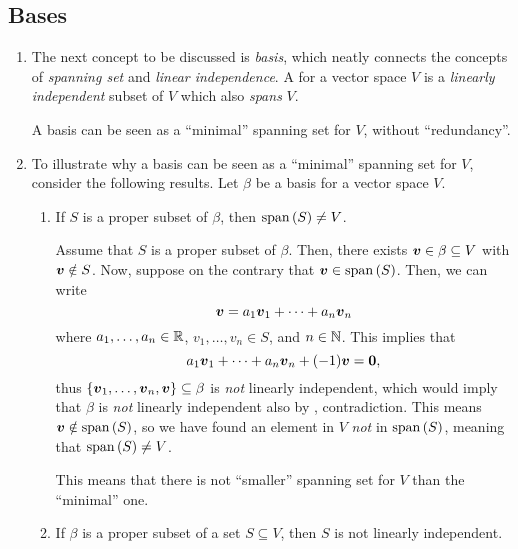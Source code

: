 \subsection{Bases}
\begin{enumerate}
\item The next concept to be discussed is \emph{basis}, which neatly connects
the concepts of \emph{spanning set} and \emph{linear independence}.  A
 for a vector space \(V\) is a \emph{linearly independent} subset
of \(V\) which also \emph{spans} \(V\).

\begin{intuition}
A basis can be seen as a ``minimal'' spanning set for \(V\), without
``redundancy''.
\end{intuition}

\item To illustrate why a basis can be seen as a ``minimal'' spanning set for
\(V\), consider the following results. Let \(\beta\) be a basis for a vector
space \(V\).
\begin{enumerate}
\item \label{it:span-set-not-smaller-than-basis} If \(S\) is a proper subset of \(\beta\), then \(\operatorname{span}\qty(S)\ne V\).

\begin{pf}
Assume that \(S\) is a proper subset of \(\beta\). Then, there exists
\(\vb*{v}\in\beta\subseteq V\) with \(\vb*{v}\notin S\). Now, suppose on the
contrary that \(\vb*{v}\in\operatorname{span}\qty(S)\). Then, we can write
\[
\vb*{v}=a_1\vb*{v}_1+\dotsb+a_n\vb*{v}_n
\]
where \(a_1,\dotsc,a_n\in\mathbb{R}\), \(v_1,\dotsc,v_n\in S\), and \(n\in\mathbb{N}\).
This implies that
\[
a_1\vb*{v}_1+\dotsb+a_n\vb*{v}_n+(-1)\vb*{v}=\vb*{0},
\]
thus \(\{\vb*{v}_1,\dotsc,\vb*{v}_n,\vb*{v}\}\subseteq \beta\) is \emph{not}
linearly independent, which would imply that \(\beta\) is \emph{not} linearly
independent also by , contradiction. This means
\(\vb*{v}\notin\operatorname{span}\qty(S)\), so we have found an element in \(V\) \emph{not} in
\(\operatorname{span}\qty(S)\), meaning that \(\operatorname{span}\qty(S)\ne V\).
\end{pf}

\begin{intuition}
This means that there is not ``smaller'' spanning set for \(V\) than the
``minimal'' one.
\end{intuition}
\item \label{it:span-set-greater-than-basis-ld} If \(\beta\) is a proper subset of a set \(S\subseteq V\), then \(S\) is
not linearly independent.


\end{enumerate}
\end{enumerate}
